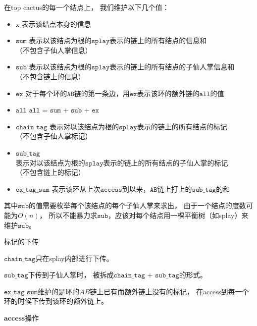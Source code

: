 \documentclass{noithesis}
\begin{document}
在top cactus的每一个结点上，
我们维护以下几个值：
\begin{itemize}
\setlength{\parskip}{-7pt}
\item $\texttt{x			}$\newline$\texttt{表示该结点本身的信息}$
\item $\texttt{sum			}$\newline$\texttt{表示以该结点为根的splay表示的链上的所有结点的信息和}$\newline$\texttt{（不包含子仙人掌信息）}$
\item $\texttt{sub			}$\newline$\texttt{表示以该结点为根的splay表示的链上的所有结点的子仙人掌信息和}$\newline$\texttt{（不包含链上的信息）}$
\item $\texttt{ex			}$\newline$\texttt{对于每个环的AB链的第一条边，用ex表示该环的额外链的all的值}$
\item $\texttt{all			}$\newline$\texttt{all = sum + sub + ex}$
\item $\texttt{chain\_tag	}$\newline$\texttt{表示对以该结点为根的splay表示的链上的所有结点的标记}$\newline$\texttt{（不包含子仙人掌标记）}$
\item $\texttt{sub\_tag		}$\newline$\texttt{表示对以该结点为根的splay表示的链上的所有结点的子仙人掌的标记}$\newline$\texttt{（不包含链上的标记）}$
\item $\texttt{ex\_tag\_sum	}$\newline$\texttt{表示该环从上次access到以来，AB链上打上的sub\_tag的和}$
\end{itemize}

其中$\texttt{sub}$的值需要枚举每个该结点的每个子仙人掌来求出，
由于一个结点的度数可能为$O(n)$，
所以不能暴力求$\texttt{sub}$，应该对每个结点用一棵平衡树（如splay）来维护$\texttt{sub}$。

$\textbf{标记的下传}$

$\texttt{chain\_tag}$只在splay内部进行下传。

$\texttt{sub\_tag}$下传到子仙人掌时，
被拆成$\texttt{chain\_tag + sub\_tag}$的形式。

$\texttt{ex\_tag\_sum}$维护的是环的$A B$链上已有而额外链上没有的标记，
在access到每一个环的时候下传到该环的额外链上。

$\textbf{access操作}$
\end{document}
